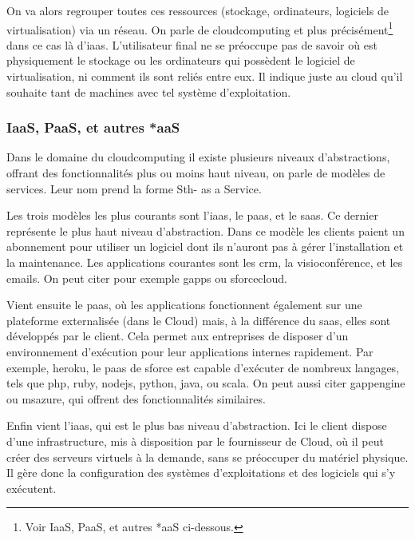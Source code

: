 \documentclass[a4paper,oneside]{report}
\begin{document}
On va alors regrouper toutes ces ressources (stockage, ordinateurs, logiciels de \gls{virtualisation}) via un réseau.
On parle de \gls{cloudcomputing} et plus précisément\footnote{Voir \og IaaS, PaaS, et autres *aaS \fg ci-dessous.} dans ce cas là d’\gls{iaas}.
L'utilisateur final ne se préoccupe pas de savoir où est physiquement le stockage ou les ordinateurs qui possèdent le logiciel de \gls{virtualisation}, ni comment ils sont reliés entre eux. Il indique juste au cloud qu’il souhaite tant de machines avec tel système d'exploitation.

\subsubsection{IaaS, PaaS, et autres *aaS}
  
Dans le domaine du \gls{cloudcomputing} il existe plusieurs niveaux d’abstractions, offrant des fonctionnalités plus ou moins haut niveau, on parle de modèles de services.
Leur nom prend la forme Sth- as a Service.

Les trois modèles les plus courants sont l'\gls{iaas}, le \gls{paas}, et le \gls{saas}.
Ce dernier représente le plus haut niveau d'abstraction.\newline
Dans ce modèle les clients paient un abonnement pour utiliser un logiciel dont ils n'auront pas à gérer l'installation et la maintenance.
Les applications courantes sont les \gls{crm}, la visioconférence, et les emails.
On peut citer pour exemple \gls{gapps} ou \gls{sforcecloud}.

Vient ensuite le \gls{paas}, où les applications fonctionnent également sur une plateforme externalisée (dans le Cloud) mais, à la différence du \gls{saas}, elles sont développés par le client.\newline
Cela permet aux entreprises de disposer d'un environnement d'exécution pour leur applications internes rapidement.
Par exemple, \gls{heroku}, le \gls{paas} de \gls{sforce} est capable d'exécuter de nombreux langages, tels que \gls{php}, \gls{ruby}, \gls{nodejs}, \gls{python}, \gls{java}, ou \gls{scala}.
On peut aussi citer \gls{gappengine} ou \gls{msazure}, qui offrent des fonctionnalités similaires.

Enfin vient l'\gls{iaas}, qui est le plus bas niveau d'abstraction. 
Ici le client dispose d'une infrastructure, mis à disposition par le fournisseur de Cloud, où il peut créer des serveurs virtuels à la demande, sans se préoccuper du matériel physique.
Il gère donc la configuration des systèmes d'exploitations et des logiciels qui s'y exécutent.
\end{document}
